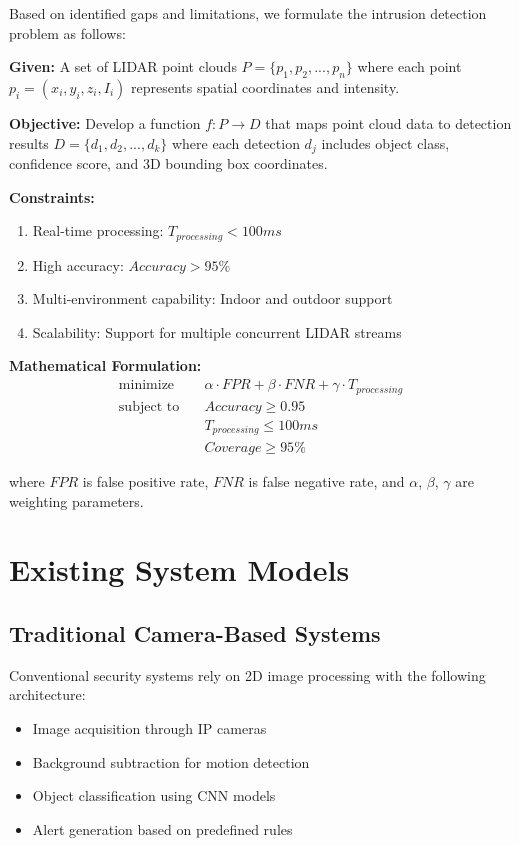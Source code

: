 \documentclass[conference]{IEEEtran}
\begin{document}
Based on identified gaps and limitations, we formulate the intrusion detection problem as follows:

\textbf{Given:} A set of LIDAR point clouds $P = \{p_1, p_2, ..., p_n\}$ where each point $p_i = (x_i, y_i, z_i, I_i)$ represents spatial coordinates and intensity.

\textbf{Objective:} Develop a function $f: P \rightarrow D$ that maps point cloud data to detection results $D = \{d_1, d_2, ..., d_k\}$ where each detection $d_j$ includes object class, confidence score, and 3D bounding box coordinates.

\textbf{Constraints:}
\begin{enumerate}
\item Real-time processing: $T_{processing} < 100ms$
\item High accuracy: $Accuracy > 95\%$
\item Multi-environment capability: Indoor and outdoor support
\item Scalability: Support for multiple concurrent LIDAR streams
\end{enumerate}

\textbf{Mathematical Formulation:}
\begin{align}
\text{minimize} \quad & \alpha \cdot FPR + \beta \cdot FNR + \gamma \cdot T_{processing} \\
\text{subject to} \quad & Accuracy \geq 0.95 \\
& T_{processing} \leq 100ms \\
& Coverage \geq 95\%
\end{align}

where $FPR$ is false positive rate, $FNR$ is false negative rate, and $\alpha$, $\beta$, $\gamma$ are weighting parameters.

\section{Existing System Models}

\subsection{Traditional Camera-Based Systems}
Conventional security systems rely on 2D image processing with the following architecture:
\begin{itemize}
\item Image acquisition through IP cameras
\item Background subtraction for motion detection
\item Object classification using CNN models
\item Alert generation based on predefined rules
\end{itemize}
\end{document}
